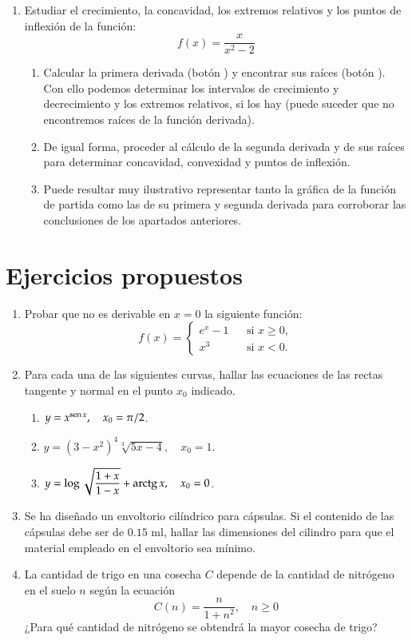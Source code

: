\begin{enumerate}[leftmargin=*]
\item Estudiar el crecimiento, la concavidad, los extremos relativos y los puntos de inflexión de la función:
\[
f(x)=\dfrac{x}{x^2-2}
\]

\begin{indicacion}
\begin{enumerate}
\item Calcular la primera derivada (botón ) y encontrar sus raíces (botón ). Con ello
podemos determinar los intervalos de crecimiento y decrecimiento y los extremos relativos, si los hay (puede suceder que no encontremos
raíces de la función derivada).
\item De igual forma, proceder al cálculo de la segunda derivada y de sus raíces para determinar concavidad, convexidad y puntos de
inflexión.
\item Puede resultar muy ilustrativo representar tanto la gráfica de la función de partida como las de su primera y segunda derivada para
corroborar las conclusiones de los apartados anteriores.
\end{enumerate}
\end{indicacion}
\end{enumerate}


\section{Ejercicios propuestos}
\begin{enumerate}[leftmargin=*]
\item  Probar que no es derivable en $x=0$ la siguiente función:
\[ f(x)=\left\{
\begin{array}{ccl}
e^x-1 &  & \mbox{si } x\geq 0,  \\
x^3 &  & \mbox{si } x<0.
\end{array}\right.
\]

\item  Para cada una de las siguientes curvas, hallar las ecuaciones de las rectas tangente y normal en el punto $x_{0}$ indicado.
\begin{enumerate}
\item  $y=x^{\operatorname{sen} x},\quad x_{0}=\pi/2$.
\item  $y=(3-x^2)^4\sqrt[3]{5x-4},\quad x_{0}=1$.
\item  $y=\log \sqrt{\dfrac{1+x}{1-x}}+\operatorname{arctg} x, \quad x_{0}=0$.
\end{enumerate}

\item Se ha diseñado un envoltorio cilíndrico para cápsulas.
Si el contenido de las cápsulas debe ser de $0.15$ ml, hallar las dimensiones del cilindro para que el material empleado en el envoltorio
sea mínimo.

\item La cantidad de trigo en una cosecha $C$ depende de la cantidad de nitrógeno en el suelo $n$ según la ecuación 
\[
C(n) = \frac{n}{1+n^2}, \quad n\geq0
\]
¿Para qué cantidad de nitrógeno se obtendrá la mayor cosecha de trigo? 
\end{enumerate}
